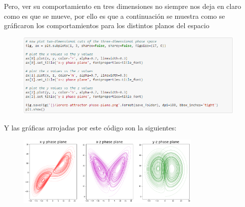 \documentclass{article}
\begin{document}
Pero, ver su comportamiento en tres dimensiones no siempre nos deja en claro como es que se mueve, por ello es que a continuación se muestra como se gráficaron los comportamientos para los distintos planos del espacio
\begin{figure}[H]
    \includegraphics[width=1\textwidth]{Celda5.PNG}
    \centering
    \label{Cod}
\end{figure}
Y las gráficas arrojadas por este código son la siguientes:
\begin{figure}[H]
    \includegraphics[width=0.8\textwidth]{GraficaTriples1.png}
    \centering
    \label{Grad}
\end{figure}
\end{document}
